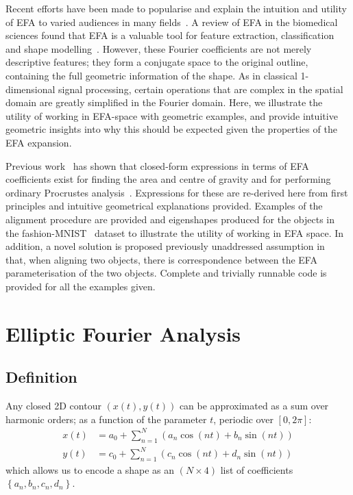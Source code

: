 \documentclass[11pt,a4paper,notitlepage]{article}
\begin{document}
Recent efforts have been made to popularise and explain the intuition and utility of EFA to varied
audiences in many fields~\cite{Caple2017,Courtenay2022,wu2024reliable}.
A review of EFA in the biomedical sciences found that EFA is a valuable tool for
feature extraction, classification and shape modelling~\cite{Valizadeh2022}.
However, these Fourier coefficients are not merely descriptive features; they form a conjugate space to
the original outline, containing the full geometric information of the shape. As in classical 1-dimensional signal processing,
certain operations that are complex in the spatial domain are greatly simplified in the Fourier domain.
Here, we illustrate the utility of working in EFA-space with geometric examples, and provide intuitive geometric insights
into why this should be expected given the properties of the EFA expansion.

Previous work~\cite{Sjostrand_Ericsson_Larsen_2006} has shown that closed-form expressions in terms of EFA coefficients
exist for finding the area and centre of gravity and for performing ordinary Procrustes analysis~\cite{Gower2004}.
Expressions for these are re-derived here from first principles and intuitive geometrical explanations provided.
Examples of the alignment procedure are provided and eigenshapes produced for the objects in the fashion-MNIST~\cite{} dataset
to illustrate the utility of working in EFA space.
In addition, a novel solution is proposed previously unaddressed assumption in~\cite{Sjostrand_Ericsson_Larsen_2006} that,
when aligning two objects, there is correspondence between the EFA parameterisation of the two objects.
Complete and trivially runnable code is provided for all the examples given.


\section{Elliptic Fourier Analysis}
\subsection{Definition}
\label{app:efa-definition}
Any closed 2D contour $\left(x(t), y(t)\right)$ can be approximated as a sum over harmonic orders;
as a function of the parameter $t$, periodic over $\left[0, 2\pi \right]$:
\begin{equation}
	\label{eqn:EFDs}
	\begin{aligned}
		x(t) & = a_0 + \sum_{n=1}^{N}
		\left(
		a_n\cos(nt) + b_n\sin(nt)
		\right)                       \\
		y(t) & = c_0 + \sum_{n=1}^{N}
		\left(
		c_n\cos(nt) + d_n\sin(nt)
		\right)
	\end{aligned}
\end{equation}
which allows us to encode a shape as an $\left(N\times4\right)$ list of coefficients $\left\{a_n,b_n,c_n,d_n\right\}$.
\end{document}
